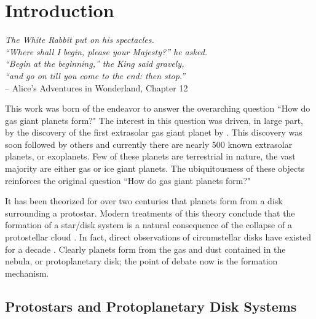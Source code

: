 \chapter[Introduction]{Introduction}\label{chap:intro}
\thispagestyle{plain}
\begin{spacing}{0.9}
\begin{flushright}
{\it \footnotesize The White Rabbit put on his spectacles. \\``Where shall I begin, please your Majesty?'' he asked. \\
``Begin at the beginning,'' the King said gravely,\\ ``and go on till you come to the end: then stop.''\\}
 {\small -- Alice's Adventures in Wonderland, Chapter 12}
\end{flushright}
\end{spacing}

This work was born of the endeavor to answer the overarching question ``How do gas giant planets form?" The interest in this question was driven, in large part, by the discovery of the first extrasolar gas giant planet by \citet{mayor1995}. This discovery was soon followed by others and currently there are nearly 500 known extrasolar planets, or exoplanets. Few of these planets are terrestrial in nature, the vast majority are either gas or ice giant planets. The ubiquitousness of these objects reinforces the original question ``How do gas giant planets form?"

It has been theorized for over two centuries \citep{kant1755} that planets form from a disk surrounding a protostar. Modern treatments of this theory conclude that the formation of a star/disk system is a natural consequence of the collapse of a protostellar cloud \citep{cassen1981,yorke1993,vorobyov2006}. In fact, direct observations of circumstellar disks have existed for a decade \citep{padgett1999}. Clearly planets form from the gas and dust contained in the nebula, or protoplanetary disk; the point of debate now is the formation mechanism.

\section{Protostars and Protoplanetary Disk Systems}\label{sec:disks}


